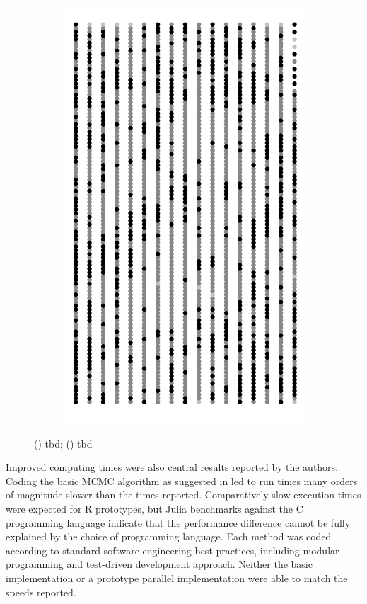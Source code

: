 \documentclass{uwstat572}
\begin{document}
\begin{figure}[H]
\begin{subfigure}[b]{0.24\textwidth}
		\includegraphics[width=\textwidth]{figures/figure_5d.png}
		\caption{}
		\label{fig:week_60}
	\end{subfigure}
	\caption{() tbd; () tbd }
	\label{fig:prediction}
\end{figure} 

Improved computing times were also central results reported by the authors.
Coding the basic MCMC algorithm as suggested in \citet{Brown} led to run times many orders of magnitude slower than the times reported. 
Comparatively slow execution times were expected for R prototypes, but Julia benchmarks against the C programming language indicate that the performance difference cannot be fully explained by the choice of programming language. 
Each method was coded according to standard software engineering best practices, including modular programming and test-driven development approach.  
Neither the basic implementation or a prototype parallel implementation were able to match the speeds reported. 
\end{document}
